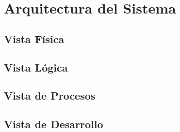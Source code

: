 \section{Arquitectura del Sistema}

\subsection{Vista Física}

\subsection{Vista Lógica}

\subsection{Vista de Procesos}

\subsection{Vista de Desarrollo}
